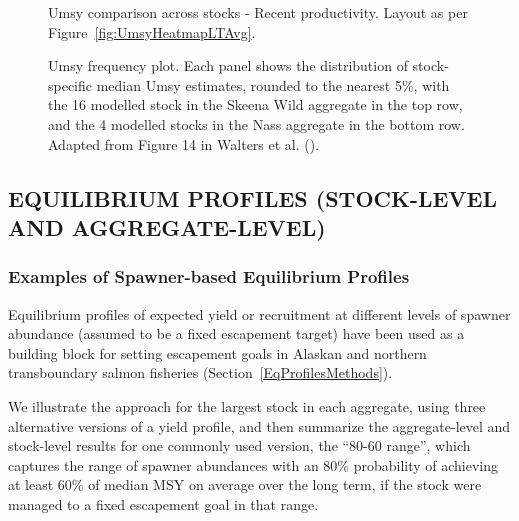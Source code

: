 \documentclass[french,11pt]{book}
\begin{document}
\endgroup{} \endgroup{}

\clearpage


\begin{figure}[htb]

{\centering {} 

}

\caption{Umsy comparison across stocks - Recent productivity. Layout as per Figure~\ref{fig:UmsyHeatmapLTAvg}.}\label{fig:UmsyHeatmapRecent}
\end{figure}
\clearpage


\begin{figure}[htb]

{\centering {} 

}

\caption{Umsy frequency plot. Each panel shows the distribution of stock-specific median Umsy estimates, rounded to the nearest 5\%, with the 16 modelled stock in the Skeena Wild aggregate in the top row, and the 4 modelled stocks in the Nass aggregate in the bottom row. Adapted from Figure 14 in Walters et al. ().}\label{fig:UmsyHisto}
\end{figure}
\clearpage

\subsection{EQUILIBRIUM PROFILES (STOCK-LEVEL AND AGGREGATE-LEVEL)}\label{ProfileResults}

\subsubsection{Examples of Spawner-based Equilibrium Profiles}\label{examples-of-spawner-based-equilibrium-profiles}

Equilibrium profiles of expected yield or recruitment at different levels of spawner abundance (assumed to be a fixed escapement target) have been used as a building block for setting escapement goals in Alaskan and northern transboundary salmon fisheries (Section~\ref{EqProfilesMethods}).

We illustrate the approach for the largest stock in each aggregate, using three alternative versions of a yield profile, and then summarize the aggregate-level and stock-level results for one commonly used version, the ``80-60 range'', which captures the range of spawner abundances with an 80\% probability of achieving at least 60\% of median MSY on average over the long term, if the stock were managed to a fixed escapement goal in that range.
\end{document}
